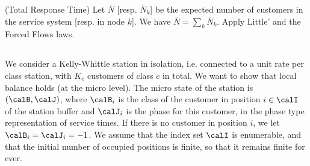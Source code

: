 \begin{petit}
(Total Response Time) Let $\bar{N}$ [resp.
$\bar{N}_k$] be the expected number of customers
in the service system [resp. in node $k$]. We
have $\bar{N}=\sum_k\bar{N}_k$. Apply Little' and
the Forced Flows laws.

%
%

\subsection*{}
We consider a Kelly-Whittle station in isolation, i.e.
connected to a unit rate per class station, with $K_c$
customers of class $c$ in total. We want to show that local
balance holds (at the micro level). The micro state of the
station is $(\calB, \calJ)$, where $\calB_i$ is the class of
the customer in position $i\in \calI$ of the station buffer and
$\calJ_i$ is the phase for this customer, in the phase type
representation of service times. If there is no customer in
position $i$, we let $\calB_i=\calJ_i= -1$. We assume that the
index set $\calI$ is enumerable, and that the initial number of
occupied positions is finite, so that it remains finite for
ever.


\end{petit}
